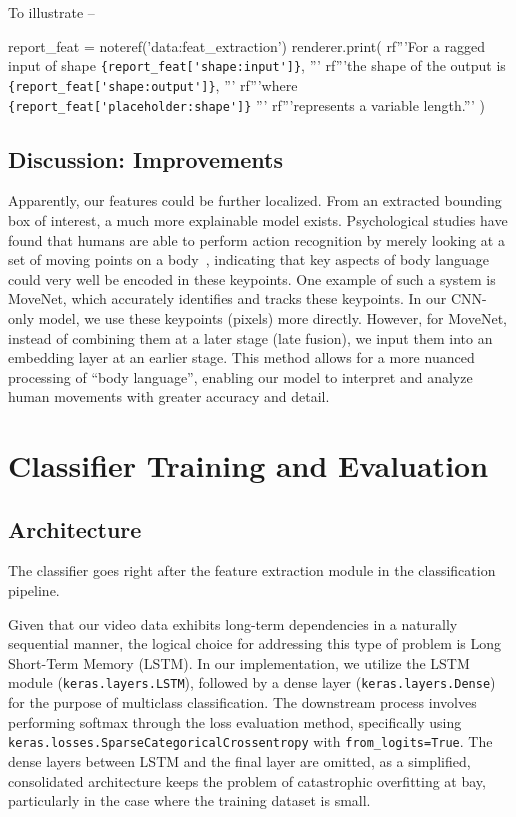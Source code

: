 \documentclass[letterpaper]{article} %
\begin{document}
To illustrate --
\begin{python}
  report_feat = noteref('data:feat_extraction')
  renderer.print(
    rf'''For a ragged input of shape \lstinline|{report_feat['shape:input']}|, '''
    rf'''the shape of the output is \lstinline|{report_feat['shape:output']}|, '''
    rf'''where \lstinline|{report_feat['placeholder:shape']}| '''
    rf'''represents a variable length.'''
  )
\end{python}

\subsection{Discussion: Improvements}
Apparently, our features could be further localized. 
From an extracted bounding box of interest, a much more explainable model exists. 
Psychological studies have found that humans are able to perform action recognition 
by merely looking at a set of moving points on a body~\citep{Johansson1973}, 
indicating that key aspects of body language could 
very well be encoded in these keypoints.
One example of such a system is MoveNet, 
which accurately identifies and tracks these keypoints. 
In our CNN-only model, we use these keypoints (pixels) more directly. 
However, for MoveNet, instead of combining them at a later stage (late fusion), 
we input them into an embedding layer at an earlier stage. 
This method allows for a more nuanced processing of ``body language'', 
enabling our model to interpret and analyze human movements 
with greater accuracy and detail.

\section{Classifier Training and Evaluation}

\subsection{Architecture}
The classifier goes right after the feature extraction
module in the classification pipeline.

Given that our video data exhibits long-term dependencies 
in a naturally sequential manner, the logical choice for 
addressing this type of problem is Long Short-Term Memory (LSTM). 
In our implementation, we utilize the LSTM module (\lstinline|keras.layers.LSTM|), 
followed by a dense layer (\lstinline|keras.layers.Dense|) 
for the purpose of multiclass classification. 
The downstream process involves performing softmax 
through the loss evaluation method, specifically using \lstinline|keras.losses.SparseCategoricalCrossentropy| 
with \lstinline|from_logits=True|.
The dense layers between LSTM and the final layer
are omitted, as a simplified, consolidated
architecture keeps the problem of catastrophic overfitting at bay,
particularly in the case where the training dataset is small.
\end{document}
